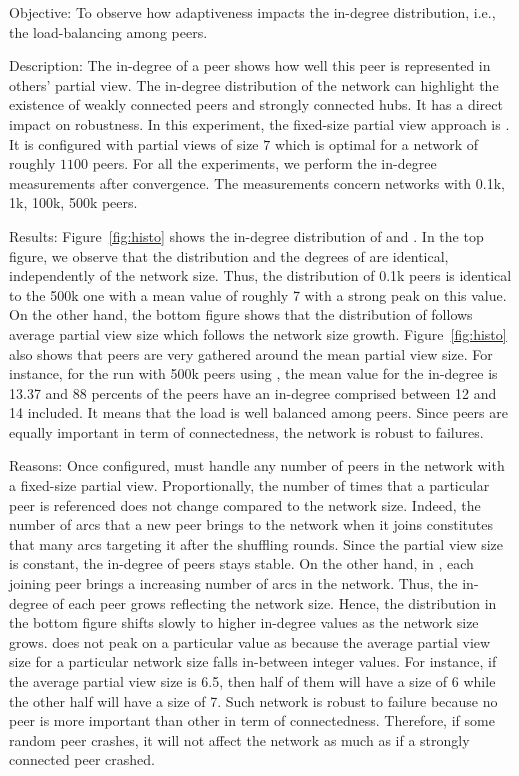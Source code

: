 \begin{asparadesc}
\item[Objective:] To observe how adaptiveness impacts the in-degree
  distribution, i.e., the load-balancing among peers.
\item[Description:] The in-degree of a peer shows how well this peer is
  represented in others' partial view. The in-degree distribution of the
  network can highlight the existence of weakly connected peers and strongly
  connected hubs. It has a direct impact on robustness. In this experiment, the
  fixed-size partial view approach is \CYCLON{}. It is configured with partial
  views of size $7$ which is optimal for a network of roughly $1100$ peers.
  For all the experiments, we perform the in-degree measurements after
  convergence. The measurements concern networks with 0.1k, 1k, 100k, 500k
  peers.
\item[Results:] Figure~\ref{fig:histo} shows the in-degree distribution of
  \CYCLON and \SPRAY. In the top figure, we observe that the distribution and
  the degrees of \CYCLON are identical, independently of the network
  size. Thus, the distribution of 0.1k peers is identical to the 500k one with
  a mean value of roughly 7 with a strong peak on this value. On the other
  hand, the bottom figure shows that the distribution of \SPRAY follows average
  partial view size which follows the network size
  growth. Figure~\ref{fig:histo} also shows that peers are very gathered around
  the mean partial view size. For instance, for the run with 500k peers using
  \SPRAY, the mean value for the in-degree is 13.37 and 88 percents of the
  peers have an in-degree comprised between 12 and 14 included. It means that
  the load is well balanced among peers. Since peers are equally important in
  term of connectedness, the network is robust to failures.
\item[Reasons:] Once configured, \CYCLON must handle any number of peers in the
  network with a fixed-size partial view. Proportionally, the number of times
  that a particular peer is referenced does not change compared to the network
  size. Indeed, the number of arcs that a new peer brings to the network when it
  joins constitutes that many arcs targeting it after the shuffling
  rounds. Since the partial view size is constant, the in-degree of peers stays
  stable. On the other hand, in \SPRAY, each joining peer brings a increasing
  number of arcs in the network. Thus, the in-degree of each peer grows
  reflecting the network size. Hence, the distribution in the bottom figure
  shifts slowly to higher in-degree values as the network size grows.  \SPRAY
  does not peak on a particular value as \CYCLON because the average partial
  view size for a particular network size falls in-between integer values. For
  instance, if the average partial view size is 6.5, then half of them will
  have a size of 6 while the other half will have a size of 7. Such network is
  robust to failure because no peer is more important than other in term of
  connectedness. Therefore, if some random peer crashes, it will not affect
  the network as much as if a strongly connected peer crashed.
\end{asparadesc}


